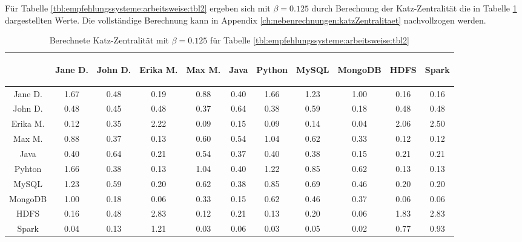 Für Tabelle \ref{tbl:empfehlungssysteme:arbeitsweise:tbl2} ergeben sich mit $\beta = 0.125$ durch Berechnung der Katz-Zentralität die in Tabelle \ref{tbl:empfehlungssysteme:arbeitsweise:tbl3} dargestellten Werte. Die vollständige Berechnung kann in Appendix \ref{ch:nebenrechnungen:katzZentralitaet} nachvollzogen werden.

\begin{table}[h]
	\centering
	\begin{tabular}{c|c|c|c|c|c|c|c|c|c|c}
		& \begin{sideways}Jane D.\end{sideways} & \begin{sideways}John D.\end{sideways} & \begin{sideways}Erika M.\end{sideways} & \begin{sideways}Max M.\end{sideways} & \begin{sideways}Java\end{sideways} & \begin{sideways}Python\end{sideways} & \begin{sideways}MySQL\end{sideways} & \begin{sideways}MongoDB\end{sideways} & \begin{sideways}HDFS\end{sideways} & \begin{sideways}Spark\end{sideways} \\ 
		\hline
		Jane D.  & 1.67 & 0.48 & 0.19 & 0.88 & 0.40 & 1.66 & 1.23 & 1.00 & 0.16 & 0.16\\
		John D.  & 0.48 & 0.45 & 0.48 & 0.37 & 0.64 & 0.38 & 0.59 & 0.18 & 0.48 & 0.48\\
		Erika M. & 0.12 & 0.35 & 2.22 & 0.09 & 0.15 & 0.09 & 0.14 & 0.04 & 2.06 & 2.50\\
		Max M.   & 0.88 & 0.37 & 0.13 & 0.60 & 0.54 & 1.04 & 0.62 & 0.33 & 0.12 & 0.12\\
		Java     & 0.40 & 0.64 & 0.21 & 0.54 & 0.37 & 0.40 & 0.38 & 0.15 & 0.21 & 0.21\\
		Pyhton   & 1.66 & 0.38 & 0.13 & 1.04 & 0.40 & 1.22 & 0.85 & 0.62 & 0.13 & 0.13\\
		MySQL    & 1.23 & 0.59 & 0.20 & 0.62 & 0.38 & 0.85 & 0.69 & 0.46 & 0.20 & 0.20\\
		MongoDB  & 1.00 & 0.18 & 0.06 & 0.33 & 0.15 & 0.62 & 0.46 & 0.37 & 0.06 & 0.06\\
		HDFS     & 0.16 & 0.48 & 2.83 & 0.12 & 0.21 & 0.13 & 0.20 & 0.06 & 1.83 & 2.83\\
		Spark    & 0.04 & 0.13 & 1.21 & 0.03 & 0.06 & 0.03 & 0.05 & 0.02 & 0.77 & 0.93
	\end{tabular}
	\caption{Berechnete Katz-Zentralität mit $\beta = 0.125$ für Tabelle \ref{tbl:empfehlungssysteme:arbeitsweise:tbl2}}
	\label{tbl:empfehlungssysteme:arbeitsweise:tbl3}
\end{table}

